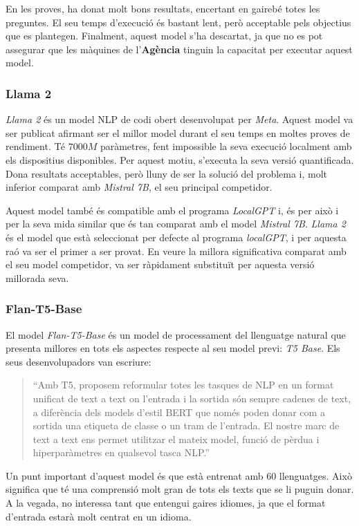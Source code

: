 En les proves, ha donat molt bons resultats, encertant en gairebé totes les preguntes. El seu temps d'execució és bastant lent, però acceptable pels objectius que es plantegen. Finalment, aquest model s'ha descartat, ja que no es pot assegurar que les màquines de l'\textbf{Agència} tinguin la capacitat per executar aquest model.


\subsubsection{Llama 2}
\textit{Llama 2} \cite{llama} és un model NLP de codi obert desenvolupat per \textit{Meta}. Aquest model va ser publicat afirmant ser el millor model durant el seu temps en moltes proves de rendiment. Té $7000M$ paràmetres, fent impossible la seva execució localment amb els dispositius disponibles. Per aquest motiu, s'executa la seva versió quantificada. Dona resultats acceptables, però lluny de ser la solució del problema i, molt inferior comparat amb \textit{Mistral 7B}, el seu principal competidor.

Aquest model també és compatible amb el programa \textit{LocalGPT} \cite{localgpt} i, és per això i per la seva mida similar que és tan comparat amb el model \textit{Mistral 7B}. \textit{Llama 2} és el model que està seleccionat per defecte al programa \textit{localGPT}, i per aquesta raó va ser el primer a ser provat. En veure la millora significativa comparat amb el seu model competidor, va ser ràpidament substituït per aquesta versió millorada seva.


\subsubsection{Flan-T5-Base}
El model \textit{Flan-T5-Base} \cite{flan-t5} és un model de processament del llenguatge natural que presenta millores en tots els aspectes respecte al seu model previ: \textit{T5 Base}. Els seus desenvolupadors van escriure: 
\begin{quote}
``Amb T5, proposem reformular totes les tasques de NLP en un format unificat de text a text on l'entrada i la sortida són sempre cadenes de text, a diferència dels models d'estil BERT que només poden donar com a sortida una etiqueta de classe o un tram de l'entrada. El nostre marc de text a text ens permet utilitzar el mateix model, funció de pèrdua i hiperparàmetres en qualsevol tasca NLP.''
\end{quote}

Un punt important d'aquest model és que està entrenat amb 60 llenguatges. Això significa que té una comprensió molt gran de tots els texts que se li puguin donar. A la vegada, no interessa tant que entengui gaires idiomes, ja que el format d'entrada estarà molt centrat en un idioma.

